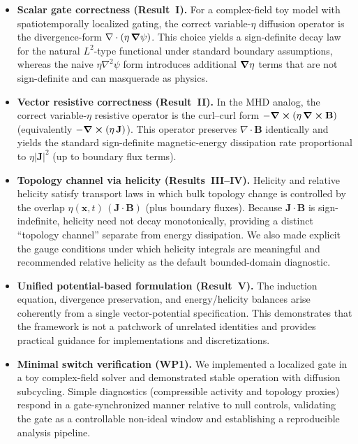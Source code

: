 \documentclass[11pt]{article}
\theoremstyle{plain}
\theoremstyle{definition}
\theoremstyle{remark}
\newcommand{\diver}{\nabla\cdot}
\newcommand{\B}{\mathbf{B}}
\newcommand{\J}{\mathbf{J}}
\begin{document}
\begin{itemize}[leftmargin=*]
  \item \textbf{Scalar gate correctness (Result~I).}
  For a complex-field toy model with spatiotemporally localized gating, the correct variable-$\eta$
  diffusion operator is the divergence-form $\diver(\eta\,\grad\psi)$. This choice yields a sign-definite
  decay law for the natural $L^2$-type functional under standard boundary assumptions, whereas the naive
  $\eta\nabla^2\psi$ form introduces additional $\grad\eta$ terms that are not sign-definite and can
  masquerade as physics.

  \item \textbf{Vector resistive correctness (Result~II).}
  In the MHD analog, the correct variable-$\eta$ resistive operator is the curl--curl form
  $-\curl(\eta\,\curl\B)$ (equivalently $-\curl(\eta\,\J)$). This operator preserves $\diver\B$
  identically and yields the standard sign-definite magnetic-energy dissipation rate proportional to
  $\eta|\J|^2$ (up to boundary flux terms).

  \item \textbf{Topology channel via helicity (Results~III--IV).}
  Helicity and relative helicity satisfy transport laws in which bulk topology change is controlled by
  the overlap $\eta(\mathbf{x},t)\,(\J\cdot\B)$ (plus boundary fluxes). Because $\J\cdot\B$ is
  sign-indefinite, helicity need not decay monotonically, providing a distinct ``topology channel''
  separate from energy dissipation. We also made explicit the gauge conditions under which helicity
  integrals are meaningful and recommended relative helicity as the default bounded-domain diagnostic.

  \item \textbf{Unified potential-based formulation (Result~V).}
  The induction equation, divergence preservation, and energy/helicity balances arise coherently from a
  single vector-potential specification. This demonstrates that the framework is not a patchwork of
  unrelated identities and provides practical guidance for implementations and discretizations.

  \item \textbf{Minimal switch verification (WP1).}
  We implemented a localized gate in a toy complex-field solver and demonstrated stable operation with
  diffusion subcycling. Simple diagnostics (compressible activity and topology proxies) respond in a
  gate-synchronized manner relative to null controls, validating the gate as a controllable non-ideal
  window and establishing a reproducible analysis pipeline.
\end{itemize}
\end{document}
